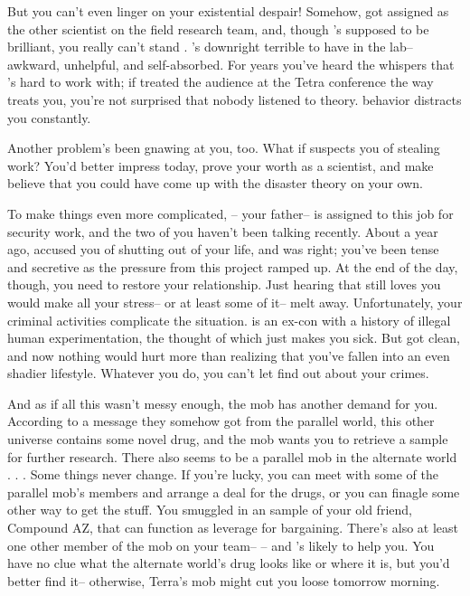 \documentclass[char]{guildcamp3}
\begin{document}
But you can't even linger on your existential despair! Somehow, \cSciTwo{} got assigned as the other scientist on the field research team, and, though \cSciTwo{\they}'s supposed to be brilliant, you really can't stand \cSciTwo{\them}. \cSciTwo{\they}'s downright terrible to have in the lab-- awkward, unhelpful, and self-absorbed. For years you've heard the whispers that \cSciTwo{\they}'s hard to work with; if \cSciTwo{\they} treated the audience at the Tetra conference the way \cSciTwo{\they} treats you, you're not surprised that nobody listened to \cSciTwo{\their} theory. \cSciTwo{\Their} behavior distracts you constantly.

Another problem's been gnawing at you, too. What if \cSciTwo{\they} suspects you of stealing \cSciTwo{\their} work? You'd better impress \cSciTwo{\them} today, prove your worth as a scientist, and make \cSciTwo{\them} believe that you could have come up with the disaster theory on your own.

To make things even more complicated, \cSpecOpOne{\intro}-- your father-- is assigned to this job for security work, and the two of you haven't been talking recently. About a year ago, \cSpecOpOne{\they} accused you of shutting \cSpecOpOne{\them} out of your life, and \cSpecOpOne{\they} was right; you've been tense and secretive as the pressure from this project ramped up. At the end of the day, though, you need to restore your relationship. Just hearing that \cSpecOpOne{\they} still loves you would make all your stress-- or at least some of it-- melt away. Unfortunately, your criminal activities complicate the situation. \cSpecOpOne{} is an ex-con with a history of illegal human experimentation, the thought of which just makes you sick. But \cSpecOpOne{\they} got clean, and now nothing would hurt \cSpecOpOne{\them} more than realizing that you've fallen into an even shadier lifestyle. Whatever you do, you can't let \cSpecOpOne{\them} find out about your crimes.

And as if all this wasn't messy enough, the mob has another demand for you. According to a message they somehow got from the parallel world, this other universe contains some novel drug, and the mob wants you to retrieve a sample for further research. There also seems to be a parallel mob in the alternate world . . . Some things never change. If you're lucky, you can meet with some of the parallel mob's members and arrange a deal for the drugs, or you can finagle some other way to get the stuff. You smuggled in an sample of your old friend, Compound AZ, that can function as leverage for bargaining. There's also at least one other member of the mob on your team-- \cSpecOpTwo{\intro}-- and \cSpecOpTwo{\they}'s likely to help you. You have no clue what the alternate world's drug looks like or where it is, but you'd better find it-- otherwise, Terra's mob might cut you loose tomorrow morning.
\end{document}
